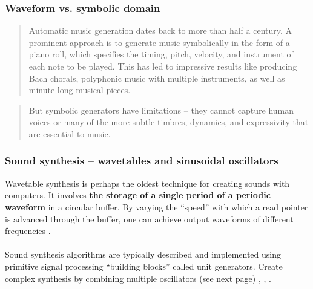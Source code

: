 \documentclass{beamer}
\begin{document}

\begin{frame}
	\frametitle{Waveform vs. symbolic domain}
	\begin{quote}
	Automatic music generation dates back to more than half a century. A prominent approach is to generate music symbolically in the form of a piano roll, which specifies the timing, pitch, velocity, and instrument of each note to be played. This has led to impressive results like producing Bach chorals, polyphonic music with multiple instruments, as well as minute long musical pieces.
	\end{quote}
	\vspace{1em}
	\begin{quote}
	But symbolic generators have limitations -- they cannot capture human voices or many of the more subtle timbres, dynamics, and expressivity that are essential to music.
	\end{quote}
\end{frame}


\begin{frame}
	\frametitle{Sound synthesis -- wavetables and sinusoidal oscillators}
	Wavetable synthesis is perhaps the oldest technique for creating sounds with computers. It involves \textbf{the storage of a single period of a periodic waveform} in a circular buffer. By varying the ``speed'' with which a read pointer is advanced through the buffer, one can achieve output waveforms of different frequencies .\\\ \\
	Sound synthesis algorithms are typically described and implemented using primitive signal processing ``building blocks'' called unit generators. Create complex synthesis by combining multiple oscillators (see next page) , , .
\end{frame}

\end{document}
